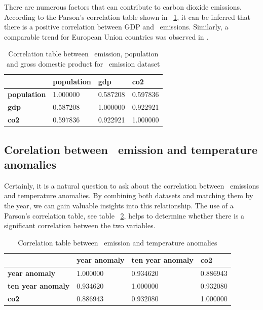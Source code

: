 There are numerous factors that can contribute to carbon dioxide emissions. According to the Parson's correlation table shown in ~\ref{tab:correlations-co2-pop-gdp}, it can be inferred that there is a positive correlation between GDP and \coo\ emissions.
Similarly, a comparable trend for European Union countries was observed in \cite{relation-between-co2-gdp}.

\begin{table}[ht]
\begin{tabular}{ |p{3cm}||p{2cm}|p{2cm}|p{2cm}|  }
 \hline
 & \textbf{population} & \textbf{gdp} & \textbf{co2} \\
 \hline
\textbf{population} &  1.000000 	& 0.587208 	& 0.597836 \\
  \textbf{gdp} &  0.587208  &	1.000000 &	0.922921  \\
  \textbf{co2} &  0.597836 &	0.922921 &	1.000000 \\
 \hline
\end{tabular}
\caption{Correlation table between \coo\ emission, population and gross domestic product for \coo\ emission dataset} 
\label{tab:correlations-co2-pop-gdp}
\end{table}

\subsection{Corelation between \coo\ emission and temperature anomalies}

Certainly, it is a natural question to ask about the correlation between \coo\ emissions and temperature anomalies. By combining both datasets and matching them by the year, we can gain valuable insights into this relationship. The use of a Parson's correlation table, see table ~\ref{tab:correlations-co2-annomalies}, helps to determine whether there is a significant correlation between the two variables.

\begin{table}[ht]
\begin{tabular}{ |p{3cm}||p{}|p{3cm}|p{}|  }
 \hline
 & \textbf{year anomaly} & \textbf{ten year anomaly} & \textbf{co2} \\
 \hline
\textbf{year anomaly} &  1.000000 &	0.934620 &	0.886943 \\
  \textbf{ten year anomaly} &  0.934620 &	1.000000 &	0.932080  \\
  \textbf{co2} &  0.886943 	& 0.932080 &	1.000000 \\
 \hline
\end{tabular}
\caption{Correlation table between \coo\ emission and temperature anomalies} 
\label{tab:correlations-co2-annomalies}
\end{table}

